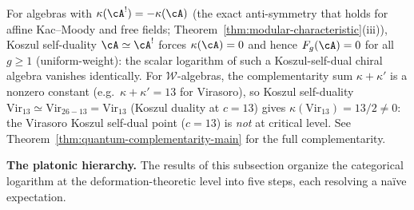 \begin{remark}
\label{rem:self-dual-anomaly-neutrality}
For algebras with $\kappa(\cA^!) = -\kappa(\cA)$ (the exact
anti-symmetry that holds for affine Kac--Moody and free fields;
Theorem~\ref{thm:modular-characteristic}(iii)), Koszul self-duality
$\cA \simeq \cA^!$ forces $\kappa(\cA) = 0$ and hence $F_g(\cA) = 0$
for all $g \geq 1$ \textup{(}uniform-weight\textup{)}: the scalar logarithm of such a Koszul-self-dual chiral
algebra vanishes identically. For $\mathcal{W}$-algebras, the
complementarity sum $\kappa + \kappa'$ is a nonzero constant
(e.g.\ $\kappa + \kappa' = 13$ for Virasoro), so Koszul
self-duality $\mathrm{Vir}_{13} \simeq \mathrm{Vir}_{26-13}
= \mathrm{Vir}_{13}$ (Koszul duality at $c = 13$)
gives $\kappa(\mathrm{Vir}_{13}) = 13/2 \neq 0$: the
Virasoro Koszul self-dual point ($c=13$) is \emph{not} at critical level.
See Theorem~\ref{thm:quantum-complementarity-main} for the full
complementarity.
\end{remark}

\medskip

\noindent\textbf{The platonic hierarchy.}\enspace
The results of this subsection organize the categorical logarithm at
the deformation-theoretic level into five steps, each resolving a
na\"ive expectation.


